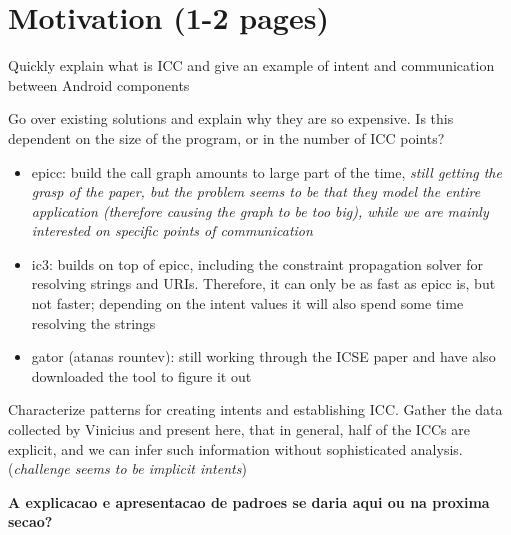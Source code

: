 \section{Motivation (1-2 pages)}

Quickly explain what is ICC and give an example of intent and communication between Android components

Go over existing solutions and explain why they are so
expensive. Is this dependent on the size of the program, or in the number of ICC points?
\begin{itemize}
 \item epicc: build the call graph amounts to large part of the time, \emph{still getting the grasp of the paper, but the problem seems to be that they model the entire application (therefore causing the graph to be too big), while we are mainly interested on specific points of communication}
 \item ic3: builds on top of epicc, including the constraint propagation solver for resolving strings and URIs. Therefore, it can only be as fast as epicc is, but not faster; depending on the intent values it will also spend some time resolving the strings
 \item gator (atanas rountev): still working through the ICSE paper and have also downloaded the tool to figure it out
\end{itemize}

Characterize patterns for creating intents and establishing ICC. Gather the data collected by Vinicius and present here, that in general, half of the ICCs are explicit, and we can infer such information without sophisticated analysis. (\emph{challenge seems to be implicit intents})

\textbf{A explicacao e apresentacao de padroes se daria aqui ou na proxima secao?}
